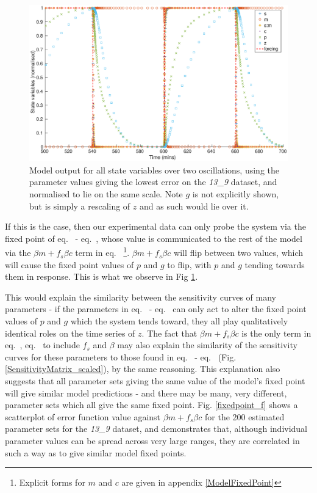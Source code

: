 \documentclass[10pt,journal]{./IEEE_latex_class/IEEEtran}
\renewcommand{\eqref}{eq.~\originaleqref}
\begin{document}
\begin{figure}[h]	
    \centering
        \includegraphics[scale = 0.23,clip = true, trim = 95 0 60 0]{model_output}
        \caption{Model output for all state variables over two oscillations, using the parameter values giving the lowest error on the \textit{13\_9} dataset, and normalised to lie on the same scale. Note $g$ is not explicitly shown, but is simply a rescaling of $z$ and as such would lie over it. }
        \label{model_output} 
\end{figure}

If this is the case, then our experimental data can only probe the system via the fixed point of \eqref{eq:s} - \eqref{eq:c}, whose value is communicated to the rest of the model via the $\beta m +f_{s}\beta c$ term in \eqref{eq:p} \footnote{ Explicit forms for $m$ and $c$ are given in appendix \ref{ModelFixedPoint}}. $\beta m +f_{s}\beta c$ will flip between two values, which will cause the fixed point values of $p$ and $g$ to flip, with $p$ and $g$ tending towards them in response. This is what we observe in Fig \ref{model_output}.

This would explain the similarity between the sensitivity curves of many parameters - if the parameters in \eqref{eq:s} - \eqref{eq:c} can only act to alter the fixed point values of $p$ and $g$ which the system tends toward, they all play qualitatively identical roles on the time series of $z$. The fact that $\beta m +f_{s}\beta c$ is the only term in \eqref{eq:p}, \eqref{eq:g} to include $f_{s}$ and $\beta$ may also explain the similarity of the sensitivity curves for these parameters to those found in \eqref{eq:s} - \eqref{eq:c} (Fig. \ref{SensitivityMatrix_scaled}), by the same reasoning. This explanation also suggests that all parameter sets giving the same value of the model's fixed point will give similar model predictions - and there may be many, very different, parameter sets which all give the same fixed point. Fig. \ref{fixedpoint_f} shows a scatterplot of error function value against $\beta m +f_{s}\beta c$ for the 200 estimated parameter sets for the \textit{13\_9} dataset, and demonstrates that, although individual parameter values can be spread across very large ranges, they are correlated in such a way as to give similar model fixed points. 
\end{document}
